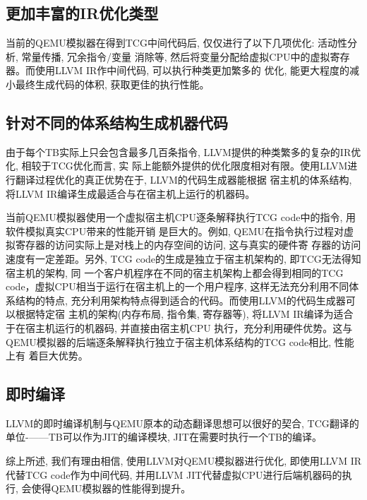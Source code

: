 \subsection{更加丰富的IR优化类型}
    当前的QEMU模拟器在得到TCG中间代码后, 仅仅进行了以下几项优化: 活动性分析, 常量传播, 冗余指令/变量
    消除等, 然后将变量分配给虚拟CPU中的虚拟寄存器。而使用LLVM IR作中间代码, 可以执行种类更加繁多的
    优化, 能更大程度的减小最终生成代码的体积, 获取更佳的执行性能。

\subsection{针对不同的体系结构生成机器代码}
    由于每个TB实际上只会包含最多几百条指令, LLVM提供的种类繁多的复杂的IR优化, 相较于TCG优化而言, 实
    际上能额外提供的优化限度相对有限。使用LLVM进行翻译过程优化的真正优势在于, LLVM的代码生成器能根据
    宿主机的体系结构, 将LLVM IR编译生成最适合与在宿主机上运行的机器码。

    当前QEMU模拟器使用一个虚拟宿主机CPU逐条解释执行TCG code中的指令, 用软件模拟真实CPU带来的性能开销
    是巨大的。例如, QEMU在指令执行过程对虚拟寄存器的访问实际上是对栈上的内存空间的访问, 这与真实的硬件寄
    存器的访问速度有一定差距。另外, TCG code的生成是独立于宿主机架构的, 即TCG无法得知宿主机的架构, 同
    一个客户机程序在不同的宿主机架构上都会得到相同的TCG code，虚拟CPU相当于运行在宿主机上的一个用户程序,
    这样无法充分利用不同体系结构的特点, 充分利用架构特点得到适合的代码。而使用LLVM的代码生成器可以根据特定宿
    主机的架构(内存布局, 指令集, 寄存器等), 将LLVM IR编译为适合于在宿主机运行的机器码, 并直接由宿主机CPU
    执行，充分利用硬件优势。这与QEMU模拟器的后端逐条解释执行独立于宿主机体系结构的TCG code相比, 性能上有
    着巨大优势。

\subsection{即时编译}
    LLVM的即时编译机制与QEMU原本的动态翻译思想可以很好的契合, TCG翻译的单位-——TB可以作为JIT的编译模块,
    JIT在需要时执行一个TB的编译。

    综上所述, 我们有理由相信, 使用LLVM对QEMU模拟器进行优化, 即使用LLVM IR代替TCG code作为中间代码,
    并用LLVM JIT代替虚拟CPU进行后端机器码的执行, 会使得QEMU模拟器的性能得到提升。



